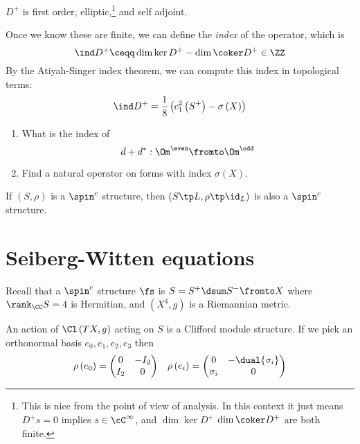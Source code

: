 \documentclass{amsart}
\begin{document}
\begin{thm}
$D^+$ is first order, elliptic,\footnote{
This is nice from the point of view of analysis.
In this context it just means $D^+ s = 0$ implies $s\in \cC^\infty$,
and $\dim \ker D^+$ $\dim \coker D^+$ are both finite.}
and self adjoint.
\end{thm}

Once we know these are finite, we can define the \emph{index} of the operator, which is 
\begin{equation}
\ind D^+ \ceqq\dim\ker D^+ - \dim\coker D^+ \in \ZZ
\end{equation}
By the Atiyah-Singer index theorem, we can compute this index in topological terms:
\begin{equation}
\ind D^+ = \frac{1}{8}\left( 
c_1^2\left( S^+ \right) - \sigma\left( X \right)\right)
\end{equation}

\begin{exr}
\begin{enumerate}
\item What is the index of 
\begin{equation}
d+ d^*:
\Om^{\even}\fromto \Om^{\odd}
\end{equation}
\item Find a natural operator on forms with index $\sigma\left( X \right)$.
\end{enumerate}
\end{exr}

\begin{fact}
If $\left( S , \rho \right)$ is a $\spin^c$ structure, then
$\left( S\tp L , \rho \tp \id_L \right)$ is also a $\spin^c$ structure.
\end{fact}

\section{Seiberg-Witten equations}

Recall that a $\spin^c$ structure $\fs$ is 
$S = S^+ \dsum S^- \fromto X$ where $\rank_\CC S = 4$ is Hermitian, and $\left( X^4 , g \right)$
is a Riemannian metric.

An action of $\Cl\left( TX , g \right)$ acting on $S$ is a Clifford module structure. 
If we pick an orthonormal basis $e_0 , e_1 , e_2 , e_3$ then
\begin{align}
\rho\left( e_0 \right) = 
\begin{pmatrix}
0 & -I_2 \\ I_2 & 0
\end{pmatrix}
&&
\rho\left( e_i \right) = 
\begin{pmatrix}
0 & -\dual{\sigma_i} \\ \sigma_i & 0
\end{pmatrix}
\end{align}
\end{document}
